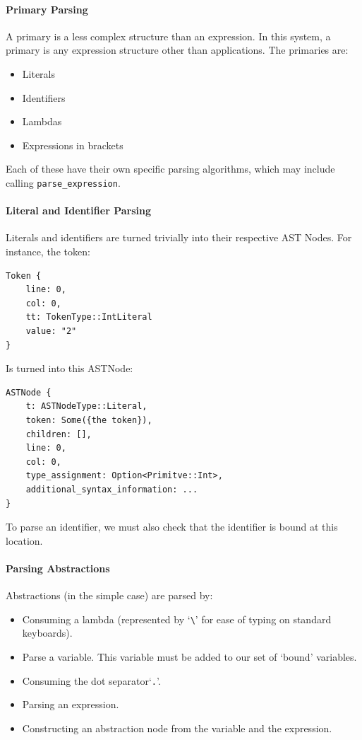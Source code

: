 \paragraph{Primary Parsing}
\label{impl:parsing_primary}
A primary is a less complex structure than an expression. In this system, a primary is any expression structure other than applications. The primaries are:
\begin{itemize}
    \item Literals
    \item Identifiers
    \item Lambdas
    \item Expressions in brackets
\end{itemize}
Each of these have their own specific parsing algorithms, which may include calling \verb|parse_expression|. 

\paragraph{Literal and Identifier Parsing}
Literals and identifiers are turned trivially into their respective AST Nodes. For instance, the token:
\begin{verbatim}
Token {
    line: 0,
    col: 0,
    tt: TokenType::IntLiteral
    value: "2"
}
\end{verbatim}
Is turned into this ASTNode:
\begin{verbatim}
ASTNode {
    t: ASTNodeType::Literal,
    token: Some({the token}),
    children: [],
    line: 0,
    col: 0,
    type_assignment: Option<Primitve::Int>,
    additional_syntax_information: ...
}
\end{verbatim}

\noindent To parse an identifier, we must also check that the identifier is bound at this location.

\paragraph{Parsing Abstractions}
Abstractions (in the simple case) are parsed by:
\begin{itemize}
    \item Consuming a lambda (represented by `\verb|\|' for ease of typing on standard keyboards).
    \item Parse a variable. This variable must be added to our set of `bound' variables.
    \item Consuming the dot separator`\verb|.|'.
    \item Parsing an expression.
    \item Constructing an abstraction node from the variable and the expression.
\end{itemize}

